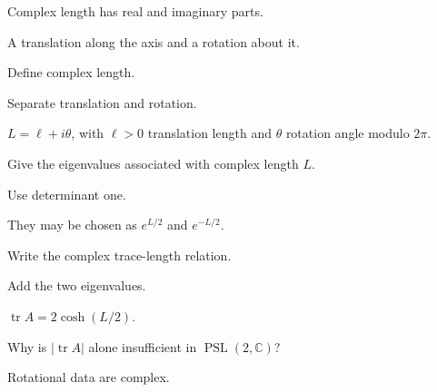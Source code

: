 \begin{hint}
Complex length has real and imaginary parts.
\end{hint}

\begin{solution}
A translation along the axis and a rotation about it.
\end{solution}

\begin{exercise}\label{exr:vii36-18}
Define complex length.
\end{exercise}

\begin{hint}
Separate translation and rotation.
\end{hint}

\begin{solution}
\(L=\ell+i\theta\), with \(\ell>0\) translation length and \(\theta\) rotation angle modulo \(2\pi\).
\end{solution}

\begin{exercise}\label{exr:vii36-19}
Give the eigenvalues associated with complex length \(L\).
\end{exercise}

\begin{hint}
Use determinant one.
\end{hint}

\begin{solution}
They may be chosen as \(e^{L/2}\) and \(e^{-L/2}\).
\end{solution}

\begin{exercise}\label{exr:vii36-20}
Write the complex trace-length relation.
\end{exercise}

\begin{hint}
Add the two eigenvalues.
\end{hint}

\begin{solution}
\(\operatorname{tr}A=2\cosh(L/2)\).
\end{solution}

\begin{exercise}\label{exr:vii36-21}
Why is \(|\operatorname{tr}A|\) alone insufficient in \(\operatorname{PSL}(2,\mathbb C)\)?
\end{exercise}

\begin{hint}
Rotational data are complex.
\end{hint}

